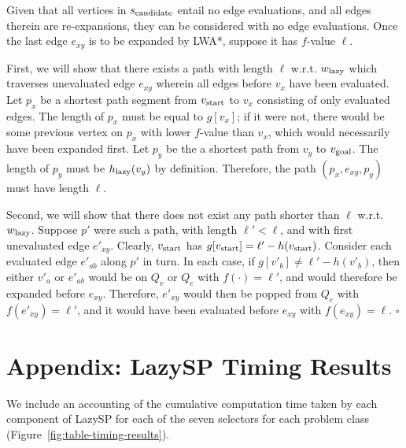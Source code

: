 \documentclass[nobib]{tufte-book}
\newcommand{\ms}[1]{\mbox{\scriptsize #1}}
\newenvironment{proof}[1][Proof]{\begin{trivlist}
   \item[\hskip \labelsep {\bfseries #1}]}{\hfill$\square$\end{trivlist}}
\begin{document}
\begin{proof}[Proof of Theorem \ref{thm:lwastar-equiv-to-lazy}]
Given that all vertices in $s_{\ms{candidate}}$ entail no edge evaluations,
and all edges therein are re-expansions,
they can be considered with no edge evaluations.
Once the last edge $e_{xy}$ is to be expanded by LWA*,
suppose it has $f$-value $\ell$.

First,
we will show that there exists a path with length $\ell$ w.r.t.
$w_{\ms{lazy}}$
which traverses unevaluated edge $e_{xy}$
wherein all edges before $v_x$ have been evaluated.
Let $p_x$ be a shortest path segment from $v_{\ms{start}}$
to $v_x$ consisting of only evaluated edges.
The length of $p_x$ must be equal to $g[v_x]$;
if it were not,
there would be some previous vertex on $p_x$ with lower $f$-value
than $v_x$,
which would necessarily have been expanded first.
Let $p_y$ be the a shortest path from $v_y$
to $v_{\ms{goal}}$.
The length of $p_y$ must be $h_{\ms{lazy}}(v_y)$
by definition.
Therefore, the path $(p_x, e_{xy}, p_y)$ must have length $\ell$.

Second,
we will show that there does not exist any path shorter than $\ell$
w.r.t. $w_{\ms{lazy}}$.
Suppose $p'$ were such a path, with length $\ell' < \ell$,
and with first unevaluated edge $e'_{xy}$.
Clearly, $v_{\ms{start}}$ has
$g[v_{\ms{start}}] = \ell' - h(v_{\ms{start}})$.
Consider each evaluated edge $e'_{ab}$ along $p'$ in turn.
In each case,
if $g[v'_b] \neq \ell' - h(v'_b)$,
then either $v'_a$ or $e'_{ab}$ would be on $Q_v$ or $Q_e$
with $f(\cdot) = \ell'$,
and would therefore be expanded before $e_{xy}$.
Therefore,
$e'_{xy}$ would then be popped from $Q_e$ with $f(e'_{xy}) = \ell'$,
and it would have been evaluated before $e_{xy}$ with $f(e_{xy}) = \ell$.
\end{proof}

\chapter{Appendix: LazySP Timing Results}
\label{sec:appendix-timing}

We include an accounting of the cumulative computation time taken by
each component of LazySP for each of the seven selectors
for each problem class (Figure~\ref{fig:table-timing-results}).
\end{document}
